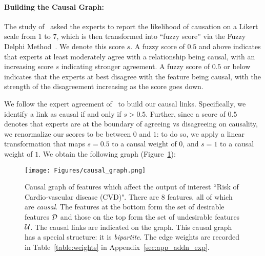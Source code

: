 \paragraph{Building the Causal Graph:} The study of~\cite{causal_cvd} asked the experts to report the likelihood of causation on a Likert scale from $1$ to $7$, which is then transformed into  ``fuzzy score'' via the Fuzzy Delphi Method~\cite{linstone1975delphi}. We denote this score $s$. A fuzzy score of $0.5$ and above indicates that experts at least moderately agree with a relationship being causal, with an increasing score $s$ indicating stronger agreement. A fuzzy score of $0.5$ or below indicates that the experts at best disagree with the feature being causal, with the strength of the disagreement increasing as the score goes down. 

We follow the expert agreement of~\cite{causal_cvd} to build our causal links. Specifically, we identify a link as causal if and only if $s > 0.5$. Further, since a score of $0.5$ denotes that experts are at the boundary of agreeing vs disagreeing on causality, we renormalize our scores to be between $0$ and $1$: to do so, we apply a linear transformation that maps $s = 0.5$ to a causal weight of $0$, and $s = 1$ to a causal weight of $1$. We obtain the following graph (Figure~\ref{fig:causal_graph}): 
\begin{figure}[hbt!]
    \centering
    \texttt{[image: Figures/causal\_graph.png]}
    \caption{Causal graph of features which affect the output of interest ``Risk of Cardio-vascular disease (CVD)". There are $8$ features, all of which are \textit{causal}. The features at the bottom form the set of desirable features $\mathcal{D}$ and those on the top form the set of undesirable features $\mathcal{U}$. The causal links are indicated on the graph. This causal graph has a special structure: it is \textit{bipartite}. The edge weights are recorded in Table~\ref{table:weights} in Appendix~\ref{sec:app_addn_exp}.}
    \label{fig:causal_graph}
\end{figure}

